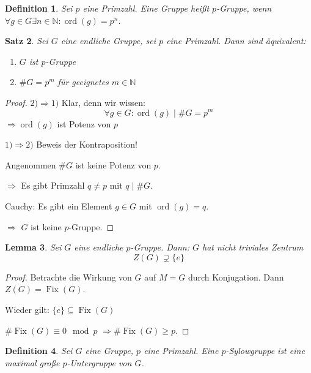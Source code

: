 \documentclass[a4paper,12pt,numbers=noenddot,parskip=full]{scrartcl}
\newcommand{\setN}{\mathbb{N}}
\newcommand{\heading}{\underline}
\theoremstyle{dotless}
\newtheorem{theorem}{Satz}[section]
\newtheorem{lemma}[theorem]{Lemma}
\newtheorem{definition}[theorem]{Definition}
\theoremstyle{remark}
\begin{document}
	\begin{definition}
		Sei $p$ eine Primzahl. Eine Gruppe heißt $p$-Gruppe, wenn $\forall g \in G \exists n \in \setN: \operatorname{ord}(g) = p^n$.
	\end{definition}

	\begin{theorem}
		Sei $G$ eine endliche Gruppe, sei $p$ eine Primzahl. Dann sind äquivalent:
		\begin{enumerate}
			\item $G$ ist $p$-Gruppe
			\item $\#G = p^m$ für geeignetes $m \in \setN$
		\end{enumerate}
	\end{theorem}

	\begin{proof}
		\heading{$2) \Rightarrow 1)$} Klar, denn wir wissen:
		\begin{equation*}
			\forall g \in G: \operatorname{ord}(g) \mid \#G = p^m
		\end{equation*}
		$\Rightarrow \operatorname{ord}(g)$ ist Potenz von $p$
		
		\heading{$1) \Rightarrow 2)$} Beweis der Kontraposition!
		
		Angenommen $\#G$ ist keine Potenz von $p$.
		
		$\Rightarrow$ Es gibt Primzahl $q \neq p$ mit $q \mid \#G$.
		
		Cauchy: Es gibt ein Element $g \in G$ mit $\operatorname{ord}(g) = q$.
		
		$\Rightarrow$ $G$ ist keine $p$-Gruppe.
	\end{proof}

	\begin{lemma}
		Sei $G$ eine endliche $p$-Gruppe. Dann: $G$ hat nicht triviales Zentrum
		\begin{equation*}
			Z(G) \supsetneq \{ e \}
		\end{equation*}
	\end{lemma}

	\begin{proof}
		Betrachte die Wirkung von $G$ auf $M = G$ durch Konjugation. Dann $Z(G) = \operatorname{Fix}(G)$.
		
		Wieder gilt: $\{ e \} \subseteq \operatorname{Fix}(G)$
		
		$\#\operatorname{Fix}(G) \equiv 0 \mod p$ $\Rightarrow \#\operatorname{Fix}(G) \geq p$.
	\end{proof}

	\begin{definition}
		Sei $G$ eine Gruppe, $p$ eine Primzahl. Eine $p$-Sylowgruppe ist eine maximal große $p$-Untergruppe von $G$.
	\end{definition}
\end{document}
